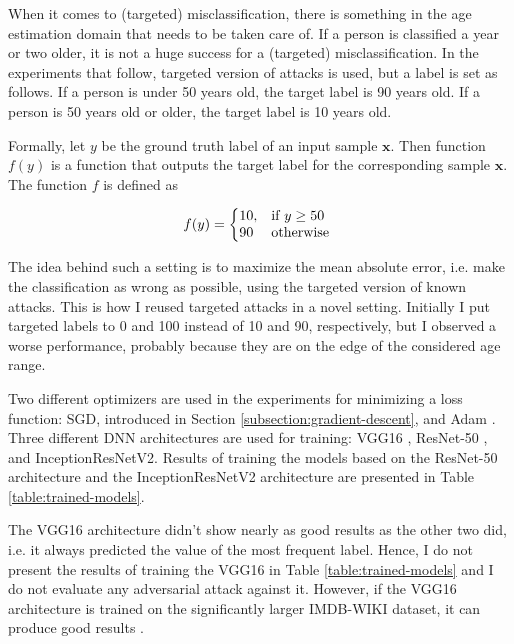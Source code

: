 When it comes to (targeted) misclassification, there is something in the age estimation domain that needs to be taken care of. If a person is classified a year or two older, it is not a huge success for a (targeted) misclassification. In the experiments that follow, targeted version of attacks is used, but a label is set as follows. If a person is under 50 years old, the target label is 90 years old. If a person is 50 years old or older, the target label is 10 years old. 

Formally, let $y$ be the ground truth label of an input sample $\pmb x$. Then function $f(y)$ is a function that outputs the target label for the corresponding sample $\pmb x$. The function $f$ is defined as

\begin{equation}
  f(y)=\left\{
  \begin{array}{@{}ll@{}}
       10, & \text{if } y \geq 50 \\
   	  90 & \text{otherwise }
  \end{array}\right.
\end{equation} 

The idea behind such a setting is to maximize the mean absolute error, i.e. make the classification as wrong as possible, using the targeted version of known attacks.  This is how I reused targeted attacks in a novel setting. Initially I put targeted labels to 0 and 100 instead of 10 and 90, respectively, but I observed a worse performance, probably because they are on the edge of the considered age range.

Two different optimizers are used in the experiments for minimizing a loss function: SGD, introduced in Section \ref{subsection:gradient-descent}, and Adam \cite{DBLP:journals/corr/KingmaB14}. Three different DNN architectures are used for training: VGG16 \cite{DBLP:journals/corr/SimonyanZ14a}, ResNet-50 \cite{DBLP:journals/corr/HeZRS15}, and InceptionResNetV2\cite{DBLP:journals/corr/SzegedyIV16}. Results of training the models based on the ResNet-50 architecture and the InceptionResNetV2 architecture are presented in Table \ref{table:trained-models}. 

The VGG16 architecture didn't show nearly as good results as the other two did, i.e. it always predicted the value of the most frequent label. Hence, I do not present the results of training the VGG16 in Table \ref{table:trained-models} and I do not evaluate any adversarial attack against it. However, if the VGG16 architecture is trained on the significantly larger IMDB-WIKI dataset, it can produce good results \cite{Rothe-IJCV-2016}. 

